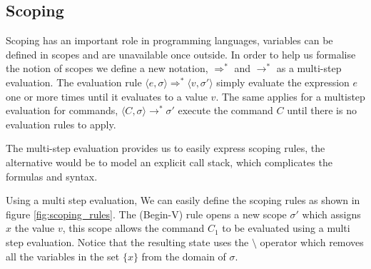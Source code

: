 \documentclass[a4paper,12pt]{report}
\begin{document}
\subsection{Scoping} \label{section:scope_sos}
Scoping has an important role in programming languages, variables can be defined 
in scopes and are unavailable once outside. 
In order to help us formalise the notion of scopes we define a new notation, 
$\Longrightarrow^{*}$ and $\longrightarrow^{*}$ as a multi-step evaluation. 
The evaluation rule $\langle e, \sigma \rangle \Longrightarrow^{*} 
\langle v, \sigma' \rangle$ simply 
evaluate the expression $e$ one or more times until it evaluates to a value $v$. 
The same applies for a multistep evaluation for commands, 
$\langle C, \sigma \rangle \longrightarrow^{*} \sigma'$ execute the command $C$ 
until there is no evaluation rules to apply. 
\par
The multi-step evaluation provides us to easily express scoping rules, 
the alternative would be to model an explicit call stack, which complicates the 
formulas and syntax.

\par
Using a multi step evaluation, We can easily define the scoping rules as shown 
in figure \ref{fig:scoping_rules}. The (Begin-V) rule opens a new scope $\sigma'$ which 
assigns $x$ the value $v$, this scope allows the command $C_1$ to be evaluated 
using a multi step evaluation. Notice that the resulting state 
uses the $\setminus$ operator which removes all the variables 
in the set $\{x\}$ from the domain of $\sigma$. 
  
\end{document}
